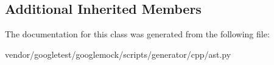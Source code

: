 \subsection*{Additional Inherited Members}


The documentation for this class was generated from the following file\+:\begin{DoxyCompactItemize}
\item 
vendor/googletest/googlemock/scripts/generator/cpp/ast.\+py\end{DoxyCompactItemize}
